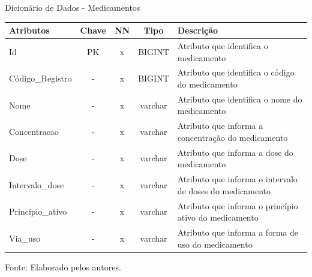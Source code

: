 \documentclass[
    12pt,               %
    openright,          %
    oneside,
    a4paper,            %
    BIBLATEX,           %
    TODO,               %
    english,            %
    brazil              %
    ]{ifsp-spo-inf-ctds}
\begin{document}
            \begin{center}
                \begin{quadro}[H]
                \centering
                    \caption{Dicionário de Dados - Medicamentos}
                    \begin{tabulary}{1.0\textwidth}{|p{9em}|c|c|c|p{19em}|}
                  \hline
                  Atributos & Chave & NN & Tipo & Descrição\\
                  \hline
                  Id & PK & x & BIGINT & Atributo que identifica o medicamento\\
                  \hline
                  Código\_Registro & - & x & BIGINT & Atributo que identifica o código do medicamento\\
                  \hline
                  Nome & - & x & varchar & Atributo que identifica o nome do medicamento\\
                  \hline
                  Concentracao & - & x & varchar & Atributo que informa a concentração do medicamento\\
                  \hline
                  Dose & - & x & varchar & Atributo que informa a dose do medicamento\\
                  \hline
                  Intervalo\_dose & - & x & varchar & Atributo que informa o intervalo de doses do medicamento\\
                  \hline
                  Principio\_ativo & - & x & varchar & Atributo que informa o princípio ativo do medicamento\\
                  \hline
                  Via\_uso & - & x & varchar & Atributo que informa a forma de uso do medicamento\\
                  \hline
                  \end{tabulary}
                   
                    \label{qd: md-medicamento}
                    \centering
                  {\footnotesize Fonte: Elaborado pelos autores.}
                \end{quadro}
              \end{center} 
              
\end{document}
